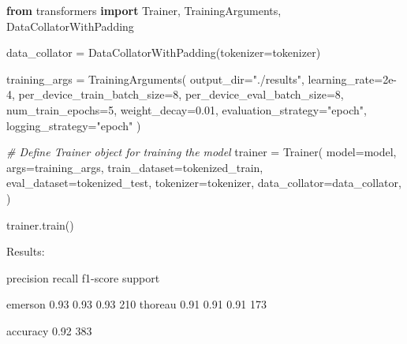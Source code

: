 \documentclass[
]{article}
\newenvironment{Shaded}{}{}
\newcommand{\CommentTok}[1]{\textcolor[rgb]{0.38,0.63,0.69}{\textit{#1}}}
\newcommand{\DecValTok}[1]{\textcolor[rgb]{0.25,0.63,0.44}{#1}}
\newcommand{\FloatTok}[1]{\textcolor[rgb]{0.25,0.63,0.44}{#1}}
\newcommand{\ImportTok}[1]{\textcolor[rgb]{0.00,0.50,0.00}{\textbf{#1}}}
\newcommand{\NormalTok}[1]{#1}
\newcommand{\OperatorTok}[1]{\textcolor[rgb]{0.40,0.40,0.40}{#1}}
\newcommand{\StringTok}[1]{\textcolor[rgb]{0.25,0.44,0.63}{#1}}
\begin{document}
\begin{Shaded}
\begin{Highlighting}[]
\ImportTok{from}\NormalTok{ transformers }\ImportTok{import}\NormalTok{ Trainer, TrainingArguments, DataCollatorWithPadding}

\NormalTok{data\_collator }\OperatorTok{=}\NormalTok{ DataCollatorWithPadding(tokenizer}\OperatorTok{=}\NormalTok{tokenizer)}

\NormalTok{training\_args }\OperatorTok{=}\NormalTok{ TrainingArguments(}
\NormalTok{    output\_dir}\OperatorTok{=}\StringTok{"./results"}\NormalTok{,}
\NormalTok{    learning\_rate}\OperatorTok{=}\FloatTok{2e{-}4}\NormalTok{,}
\NormalTok{    per\_device\_train\_batch\_size}\OperatorTok{=}\DecValTok{8}\NormalTok{,}
\NormalTok{    per\_device\_eval\_batch\_size}\OperatorTok{=}\DecValTok{8}\NormalTok{,}
\NormalTok{    num\_train\_epochs}\OperatorTok{=}\DecValTok{5}\NormalTok{,}
\NormalTok{    weight\_decay}\OperatorTok{=}\FloatTok{0.01}\NormalTok{,}
\NormalTok{    evaluation\_strategy}\OperatorTok{=}\StringTok{"epoch"}\NormalTok{,}
\NormalTok{    logging\_strategy}\OperatorTok{=}\StringTok{"epoch"}
\NormalTok{)}

\CommentTok{\# Define Trainer object for training the model}
\NormalTok{trainer }\OperatorTok{=}\NormalTok{ Trainer(}
\NormalTok{    model}\OperatorTok{=}\NormalTok{model,}
\NormalTok{    args}\OperatorTok{=}\NormalTok{training\_args,}
\NormalTok{    train\_dataset}\OperatorTok{=}\NormalTok{tokenized\_train,}
\NormalTok{    eval\_dataset}\OperatorTok{=}\NormalTok{tokenized\_test,}
\NormalTok{    tokenizer}\OperatorTok{=}\NormalTok{tokenizer,}
\NormalTok{    data\_collator}\OperatorTok{=}\NormalTok{data\_collator,}
\NormalTok{)}

\NormalTok{trainer.train()}
\end{Highlighting}
\end{Shaded}

Results:

\begin{Shaded}
\begin{Highlighting}[]
\NormalTok{precision    recall  f1{-}score   support}

\NormalTok{emerson       0.93      0.93      0.93       210}
\NormalTok{thoreau       0.91      0.91      0.91       173}

\NormalTok{accuracy                          0.92       383}
\end{Highlighting}
\end{Shaded}
\end{document}
